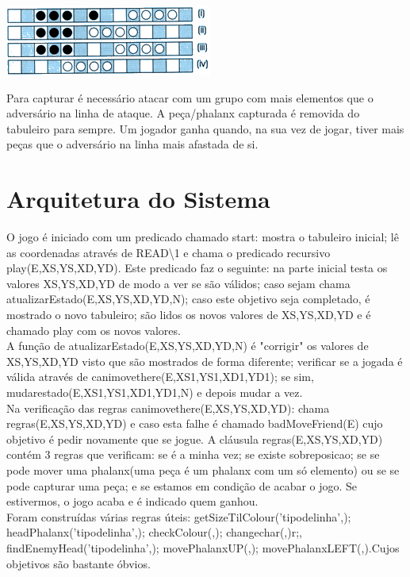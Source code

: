 \documentclass[a4paper]{article}
\begin{document}
\begin{center}
  \includegraphics[scale=0.60]{epa3.png}
\end{center}
Para capturar é necessário atacar com um grupo com mais elementos que o adversário na linha de ataque. A peça/phalanx capturada é removida do tabuleiro para sempre. Um jogador ganha quando, na sua vez de jogar, tiver mais peças que o adversário na linha mais afastada de si.\cite{rules}

\section{Arquitetura do Sistema}
O jogo é iniciado com um predicado chamado start: mostra o tabuleiro inicial; lê as coordenadas através de READ\textbackslash1 e chama o predicado recursivo play(E,XS,YS,XD,YD). Este predicado faz o seguinte: na parte inicial testa os valores XS,YS,XD,YD de modo a ver se são válidos; caso sejam chama atualizarEstado(E,XS,YS,XD,YD,N); caso este objetivo seja completado, é mostrado o novo tabuleiro; são lidos os novos valores de XS,YS,XD,YD e é chamado play com os novos valores.
\\\linebreak
A função de atualizarEstado(E,XS,YS,XD,YD,N) é "corrigir" os valores de XS,YS,XD,YD visto que são mostrados de forma diferente; verificar se a jogada é válida através de canimovethere(E,XS1,YS1,XD1,YD1); se sim, mudarestado(E,XS1,YS1,XD1,YD1,N) e depois mudar a vez.
\\\linebreak
Na verificação das regras canimovethere(E,XS,YS,XD,YD): chama regras(E,XS,YS,XD,YD) e caso esta falhe é chamado badMoveFriend(E) cujo objetivo é pedir novamente que se jogue. A cláusula regras(E,XS,YS,XD,YD) contém 3 regras que verificam: se é a minha vez; se existe sobreposicao; se se pode mover uma phalanx(uma peça é um phalanx com um só elemento) ou se se pode capturar uma peça; e se estamos em condição de acabar o jogo. Se estivermos, o jogo acaba e é indicado quem ganhou.
\\\linebreak
Foram construídas várias regras úteis: getSizeTilColour('tipodelinha',); headPhalanx('tipodelinha',); checkColour(,); changechar(,)r;, findEnemyHead('tipodelinha',); movePhalanxUP(,); movePhalanxLEFT(,).Cujos objetivos são bastante óbvios.
\end{document}
